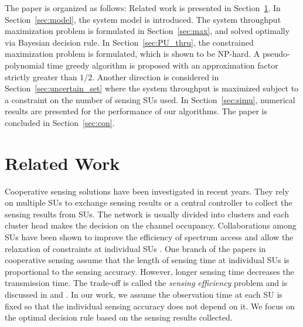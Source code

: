 \documentclass[conference]{IEEEtran}
\begin{document}
The paper is organized as follows: Related work is presented in Section~\ref{sec:related}. In Section~\ref{sec:model}, the system model is introduced. The system throughput maximization problem is formulated in Section~\ref{sec:max}, and solved optimally via Bayesian decision rule. In Section~\ref{sec:PU_thru}, the constrained maximization problem is formulated, which is shown to be NP-hard. A pseudo-polynomial time greedy algorithm is proposed with an approximation factor strictly greater than $1/2$. Another direction is considered in Section~\ref{sec:uncertain_set} where the system throughput is maximized subject to a constraint on the number
of sensing SUs used. In Section~\ref{sec:simu}, numerical results are presented for the performance of our algorithms. The paper is concluded in Section~\ref{sec:con}.  

\section{Related Work}
\label{sec:related}
Cooperative sensing solutions have been investigated in recent years. They rely on multiple SUs to exchange sensing results or a central controller to collect the sensing results from SUs. The network is usually divided into clusters and each cluster head makes the decision on the channel occupancy. Collaborations among SUs have been shown to improve the efficiency of spectrum access and allow the relaxation of constraints at individual SUs \cite{5054703}\cite{1542650}. One branch of the papers in cooperative sensing assume that the length of sensing time at individual SUs is proportional to the sensing accuracy. However, longer sensing time decreases the transmission time. The trade-off is called the \emph{sensing efficiency} problem and is discussed in \cite{Lee_2008} and \cite{Min}. In our work, we assume the observation time at each SU is fixed so that the individual sensing accuracy does not depend on it. We focus on the optimal decision rule based on the sensing results collected. 
\end{document}
